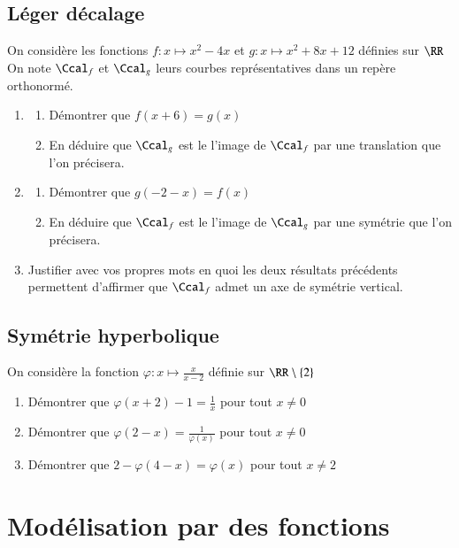 \documentclass[oneside,12pt]{article}          			%
\begin{document}
\subsection{Léger décalage}
On considère les fonctions $f:x\mapsto x^2-4x$ \quad et \quad $g:x\mapsto x^2+8x+12$ définies sur $\RR$\\
On note $\Ccal_f$ et $\Ccal_g$ leurs courbes représentatives dans un repère orthonormé.
\begin{enumerate}
	\item \begin{enumerate}
		\item Démontrer que $f(x+6)=g(x)$
		\item En déduire que $\Ccal_g$ est le l'image de $\Ccal_f$ par une translation que l'on précisera.
	\end{enumerate}
	\item \begin{enumerate}
		\item Démontrer que $g(-2-x)=f(x)$
		\item En déduire que $\Ccal_f$ est le l'image de $\Ccal_g$ par une symétrie que l'on précisera.
	\end{enumerate}
	\item Justifier avec vos propres mots en quoi les deux résultats précédents permettent d'affirmer que $\Ccal_f$ admet un axe de symétrie vertical.
\end{enumerate}




\subsection{Symétrie hyperbolique}
On considère la fonction $\varphi:x\mapsto\frac{x}{x-2}$ définie sur $\RR\setminus\{2\}$
\begin{enumerate}
	\item Démontrer que $\varphi(x+2)-1=\frac{1}{x}$ \quad pour tout $x\neq0$
	\item Démontrer que $\varphi(2-x)=\frac{1}{\varphi(x)}$ \quad pour tout $x\neq0$
	\item Démontrer que $2-\varphi(4-x)=\varphi(x)$ \quad pour tout $x\neq2$
\end{enumerate}



\section{Modélisation par des fonctions}
\end{document}
